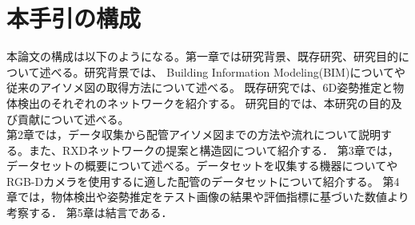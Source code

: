 \section{本手引の構成}
 本論文の構成は以下のようになる。第一章では研究背景、既存研究、研究目的について述べる。研究背景では、
Building Information Modeling(BIM)についてや従来のアイソメ図の取得方法について述べる。
既存研究では、6D姿勢推定と物体検出のそれぞれのネットワークを紹介する。
研究目的では、本研究の目的及び貢献について述べる。\\
第2章では，データ収集から配管アイソメ図までの方法や流れについて説明する。また、RXDネットワークの提案と構造図について紹介する．
第3章では，データセットの概要について述べる。データセットを収集する機器についてやRGB-Dカメラを使用するに適した配管のデータセットについて紹介する。
第4章では，物体検出や姿勢推定をテスト画像の結果や評価指標に基づいた数値より考察する．
第5章は結言である．
